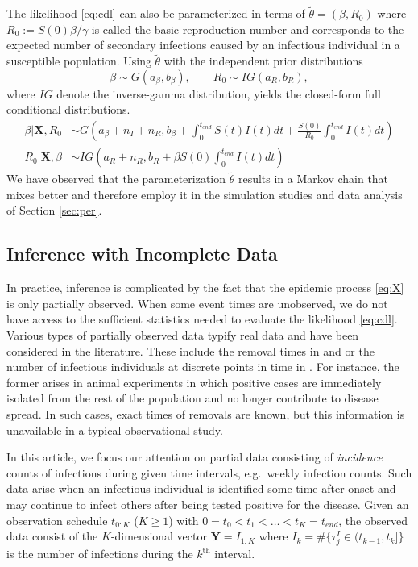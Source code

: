 \documentclass[12pt]{article}
\begin{document}
	The likelihood \eqref{eq:cdl} can also be parameterized in terms of $\tilde{\theta} = (\beta, R_0)$ where $R_0 := S(0) \beta / \gamma$ is called the basic reproduction number and corresponds to the expected number of secondary infections caused by an infectious individual in a susceptible population. Using $\tilde{\theta}$ with the independent prior distributions
	\begin{equation}
		\label{eq:pri2}
		\beta \sim G(a_{\beta}, b_{\beta}), \qquad R_0 \sim IG(a_{R}, b_{R}),
	\end{equation}
	where $IG$ denote the inverse-gamma distribution, yields the closed-form full conditional distributions.
	\begin{align}		\label{eq:posterior_theta2}
		\beta | \mathbf{X}, R_0 & \sim G\left( a_{\beta} + n_I + n_R, b_{\beta} + \int_{0}^{t_{end}} S(t)I(t) dt + \frac{S(0)}{R_0} \int_{0}^{t_{end}} I(t) dt\right) \\
		R_0 | \mathbf{X}, \beta & \sim IG\left( a_{R} + n_R, b_{R} + \beta S(0) \int_{0}^{t_{end}} I(t) dt\right)
	\end{align}
	We have observed that the parameterization $\tilde{\theta}$ results in a Markov chain that mixes better and therefore employ it in the simulation studies and data analysis of Section \ref{sec:per}.
	
	\subsection{Inference with Incomplete Data}
	\label{sec:iid}
	
	In practice, inference is complicated by the fact that the epidemic process \eqref{eq:X} is only partially observed. When some event times are unobserved, we do not have access to the sufficient statistics needed to evaluate the likelihood \eqref{eq:cdl}. Various types of partially observed data typify real data and have been considered in the literature. These include the removal times in \cite{Gibson.1998} and \cite{ONeill.1999} or the number of infectious individuals at discrete points in time in \cite{Fintzi.2017}. For instance, the former arises in animal experiments in which positive cases are immediately isolated from the rest of the population and no longer contribute to disease spread. In such cases, exact times of removals are known, but this information is unavailable in a typical observational study.
	
	In this article, we focus our attention on partial data consisting of \textit{incidence} counts of infections during given time intervals, e.g.\ weekly infection counts. Such data arise when an infectious individual is identified some time after onset and may continue to infect others after being tested positive for the disease. Given an observation schedule $t_{0:K}$ ($K \ge 1$) with $0 = t_0 < t_1 < \dots < t_K = t_{end}$, the observed data consist of the $K$-dimensional vector $\mathbf{Y} = I_{1:K}$ where $I_k = \#\{\tau^I_j \in (t_{k-1}, t_k]\}$ is the number of infections during the $k^{\text{th}}$ interval.
	
\end{document}
